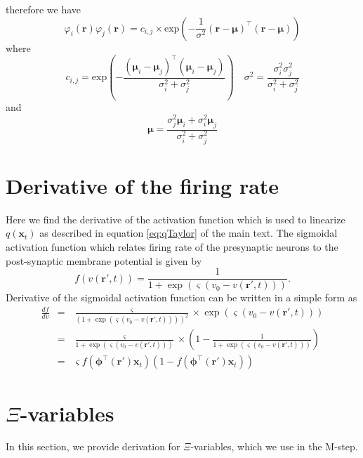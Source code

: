 \documentclass[]{article}
\begin{document}
therefore we have
\begin{equation}
 \varphi_i(\mathbf r)\varphi_j(\mathbf r)=c_{i,j}\times\mathrm{exp}\left({-\frac{1}{\sigma^2} (\mathbf r-\boldsymbol \mu)^\top(\mathbf r-\boldsymbol\mu)}\right)
\end{equation}
where
\begin{equation}
 c_{i,j}=\mathrm{exp}\left(-\frac{(\boldsymbol \mu_i-\boldsymbol\mu_j)^\top(\boldsymbol \mu_i-\boldsymbol\mu_j)}{\sigma_i^2+\sigma_j^2}\right) \quad \sigma^2=\frac{\sigma_i^2\sigma_j^2}{\sigma_i^2+\sigma_j^2}
\end{equation}
and
\begin{equation}
 \boldsymbol\mu=\frac{\sigma_j^2\boldsymbol\mu_i+\sigma_i^2\boldsymbol\mu_j}{\sigma_i^2+\sigma_j^2}
\end{equation}
\section*{Derivative of the firing rate}\label{sec:FiringrateDerivative} 
Here we find the derivative of the activation function which is used to linearize  $q\left(\mathbf x_t\right)$ as described in equation \ref{eq:qTaylor} of the main text. The sigmoidal activation function which relates firing rate of the presynaptic neurons to the post-synaptic membrane potential is given by
\begin{equation}
	\label{ActivationFunction} f\left( v\left( \mathbf{r}', t \right) \right) = \frac{1}{1 + \exp \left( \varsigma \left( v_0 - v\left(\mathbf{r}',t\right) \right) \right)}. 
\end{equation}
Derivative of the sigmoidal activation function can be written in a simple form as
\begin{eqnarray}
 \frac{df}{dv}&=& \frac{\varsigma}{\left(1 + \exp \left( \varsigma \left( v_0 - v\left(\mathbf{r}',t\right) \right) \right)\right)^2} \times \exp \left( \varsigma \left( v_0 - v\left(\mathbf{r}',t\right) \right) \right) \nonumber \\
&=&\frac{\varsigma}{1 + \exp \left( \varsigma \left( v_0 - v\left(\mathbf{r}',t\right) \right) \right)} \times \left(1-\frac{1}{1 + \exp \left( \varsigma \left( v_0 - v\left(\mathbf{r}',t\right) \right) \right)}\right) \nonumber \\
&=& \varsigma f(\boldsymbol \phi^\top(\mathbf r')\mathbf {x}_t)\left( 1-f( \boldsymbol \phi^\top(\mathbf r')\mathbf {x}_t)\right)
\end{eqnarray}
\section*{$\Xi$-variables}\label{sec:Xivariables} 
In this section, we provide derivation for $\Xi$-variables, which we use in the M-step. 
\end{document}
